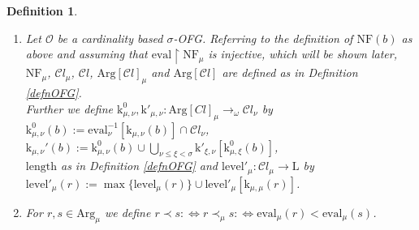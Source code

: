 \documentclass[10pt]{article}
\def \ssubitem#1{\item \label{\actlabel#1} }
\def\mycases#1{\begin{cases}#1\end{cases}}
\newtheorem {definition} [lemma]{Definition}
\def\ar{\rightarrow}
\def \Iff{\Leftrightarrow}
\def \calO{{\mathcal O}}
\def\length{\mathrm{length}}
\def\Arg{\mathrm{Arg}}
\def\k{\mathrm{k}}
\def\Cl{{\mathcal{C}l}}
\def\eval{\mathrm{eval}}
\def\C{\mathrm{C}}
\def\NF{\mathrm{NF}}
\def\L{\mathrm{L}}
\def\level{\mathrm{level}}
\def\S{\mathrm{S}}
\begin{document}
\begin{definition}
{\begin{enumerate}
$\eval_\mu(a):= \min \{ \alpha  \mid \alpha \not \in \C_\mu(a) \} $.
\ssubitem e Let $\calO$ be a cardinality based
$\sigma$-OFG. Referring to the definition of $\NF(b)$ as above and
assuming that $\eval \restriction \NF_\mu$ is injective, which
will be shown later, 
$\NF_\mu$, $\Cl_\mu$, $\Cl$,
$\Arg[\Cl]_\mu$ and $\Arg[\Cl]$ are defined as in Definition \ref{defnOFG}.\\
Further we define 
$\k^0_{\mu,\nu},\k'_{\mu,\nu}: \Arg[Cl]_\mu \ar_\omega \Cl_\nu$ by\\
$\k_{\mu,\nu}^0(b):= 
\eval_\nu^{-1}[\k_{\mu,\nu}(b)] \cap \Cl_\nu$,
$\k_{\mu,\nu}'(b):= \k^0_{\mu,\nu}(b) \cup
\bigcup_{\nu  \leq  \xi<\sigma}\k'_{\xi,\nu}[\k^0_{\mu,\xi}(b)]$,\\
$\length$ as in Definition \ref{defnOFG} and
$\level'_\mu:\Cl_\mu \ar \L$ by
$\level'_\mu(r):= \max \{ \level_\mu(r) \} 
\cup \level'_\mu[\k_{\mu,\mu}(r)]$.
\ssubitem f
For $r,s \in \Arg_\mu$ we define 
$r \prec s :\Iff r \prec_\mu s :\Iff \eval_\mu(r) < \eval_\mu(s)$.
\end{enumerate}}
\end{definition}
%
%
%
%
%
%
%
\end{document}
